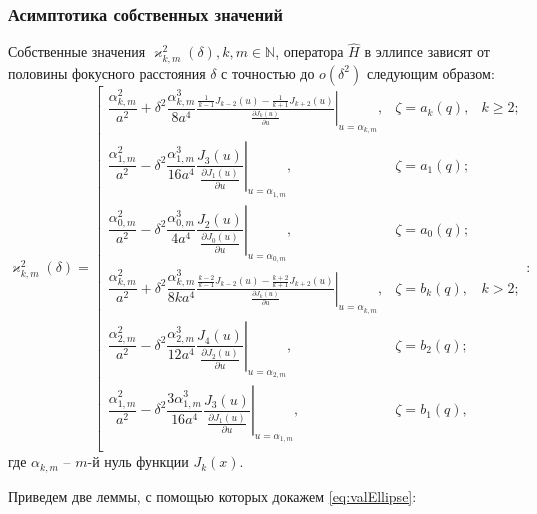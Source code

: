 \subsubsection{Асимптотика собственных значений}\label{sec:ch1/sec4/sub1/sub2}
\begin{theorem}
Собственные значения $\varkappa^2_{k,m}(\delta), k, m \in \mathbb{N}$, оператора $\hat{H}$ в эллипсе зависят от половины фокусного расстояния $\delta$ с точностью до $o(\delta^2)$ следующим образом:
{
\begin{equation}
\varkappa^2_{k,m}(\delta) = \left[
\begin{array}{ccc}
\dfrac{\alpha_{k, m}^2}{a^2} +  \delta^2 
\dfrac{\alpha_{k, m}^3}{8 a^4}
\left. \frac{\frac{1}{k-1} J_{k-2}(u) - \frac{1}{k+1}J_{k+2}(u)}{\frac{\partial J_{k} (u)}{\partial u}}\right|_{u=\alpha_{k, m}} , 
 & \zeta = a_k(q), & k \geq 2; \\
\dfrac{\alpha_{1, m}^2}{a^2} -  \delta^2 \dfrac{\alpha_{1, m}^3}{16 a^4}\left.\dfrac{J_{3}(u)}{\frac{\partial J_{1} (u)}{\partial u}}\right|_{u=\alpha_{1, m}}, & \zeta = a_1(q); \\
\dfrac{\alpha_{0, m}^2}{a^2} -  \delta^2 \dfrac{\alpha_{0, m}^3}{4 a^4}\left.\dfrac{J_{2}(u)}{\frac{\partial J_{0} (u)}{\partial u}}\right|_{u=\alpha_{0, m}},
 & \zeta = a_0(q); \\
\dfrac{\alpha_{k, m}^2}{a^2} +  \delta^2 
\dfrac{\alpha_{k, m}^3}{8 k a^4}
\left.\frac{\frac{k-2}{k-1} J_{k-2}(u) - \frac{k+2}{k+1} J_{k+2}(u)}{\frac{\partial J_{k} (u)}{\partial u}}\right|_{u=\alpha_{k, m}} , & \zeta = b_k(q), & k > 2; \\
\dfrac{\alpha_{2, m}^2}{a^2} -  \delta^2 \dfrac{\alpha_{2, m}^3}{12 a^4}\left.\dfrac{J_{4}(u)}{\frac{\partial J_{2} (u)}{\partial u}}\right|_{u=\alpha_{2, m}},
 & \zeta = b_2(q); \\
\dfrac{\alpha_{1, m}^2}{a^2} -  \delta^2 \dfrac{3\alpha_{1, m}^3}{16 a^4}\left.\dfrac{ J_{3}(u)}{\frac{\partial J_{1} (u)}{\partial u}}\right|_{u=\alpha_{1, m}},
 & \zeta = b_1(q), \\
\end{array}
\right.
\label{eq:valEllipse}:
\end{equation}
}
где $\alpha_{k, m}$ -- $m$-й нуль функции $J_k(x)$. 
\label{th:stat4}
\end{theorem}

Приведем две леммы, с помощью которых докажем \ref{eq:valEllipse}:

